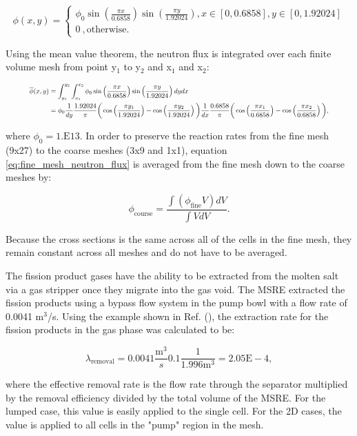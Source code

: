 \begin{equation}
\phi (x, y) = \begin{cases}
  \phi_{0} \sin\left(\frac{\pi x}{0.6858}\right)\sin\left(\frac{\pi y}{1.92024}\right) , x \in [0,0.6858], y \in [0,1.92024] \\
  0\ , \text{otherwise}.
  \label{eq:msreflux}
\end{cases}
\end{equation}

\noindent Using the mean value theorem, the neutron flux is integrated over each finite volume mesh from point y$_{1}$ to y$_{2}$ and x$_{1}$ and x$_{2}$:

\begin{equation}
\resizebox{.9 \textwidth}{!}{$
	\begin{split}
	\overline{\phi}(x,y) &= \int_{y_{1}}^{y_{2}} \int_{x_{1}}^{x_{2}} \phi_{0} \sin\left(\frac{\pi x}{0.6858}\right)\sin\left(\frac{\pi y}{1.92024}\right)dy dx \\
	&=  \phi_{0}\frac{1}{dy}\frac{1.92024}{\pi} \bigg( \cos\left(\frac{\pi y_{1}}{1.92024}\right) - \cos\left(\frac{\pi y_{2}}{1.92024}\right) \bigg) \frac{1}{dx}\frac{0.6858}{\pi} \bigg( \cos\left(\frac{\pi x_{1}}{0.6858}\right) - \cos\left(\frac{\pi x_{2}}{0.6858}\right) \bigg),
	\end{split}$}
	\label{eq:fine_mesh_neutron_flux}
\end{equation}

\noindent where $\phi_{0} = 1.\text{E}13$. In order to preserve the reaction rates from the fine mesh (9x27) to the coarse meshes (3x9 and 1x1), equation \ref{eq:fine_mesh_neutron_flux} is averaged from the fine mesh down to the coarse meshes by:

\begin{equation}
	\phi_{\text{course}} = \frac{\int (\phi_{\text{fine}}V)dV}{\int VdV}.
\end{equation}

\noindent Because the cross sections is the same across all of the cells in the fine mesh, they remain constant across all meshes and do not have to be averaged. 

The fission product gases have the ability to be extracted from the molten salt via a gas stripper once they migrate into the gas void. The MSRE extracted the fission products using a bypass flow system in the pump bowl with a flow rate of 0.0041 m$^{3}$/s. Using the example shown in Ref. (\cite{betzler2020}), the extraction rate for the fission products in the gas phase was calculated to be:

\begin{equation}
	\lambda_{\text{removal}} = 0.0041\frac{\text{m}^{3}}{s}0.1\frac{1}{1.996\text{m}^{3}} = 2.05\text{E}-4,
\end{equation}

where the effective removal rate is the flow rate through the separator multiplied by the removal efficiency divided by the total volume of the MSRE. For the lumped case, this value is easily applied to the single cell. For the 2D cases, the value is applied to all cells in the "pump" region in the mesh.   






